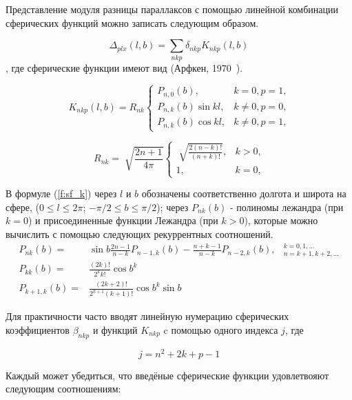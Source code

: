 \documentclass[14pt]{article} %
\begin{document}
Представление модуля разницы параллаксов с помощью линейной комбинации сферических функций можно записать следующим образом.


$$ \Delta_{plx} (l,b) = \sum_{nkp}\delta_{nkp}K_{nkp}(l,b) $$,
где сферические функции имеют вид (Арфкен, 1970~\cite{book:arfken}).

\begin{equation}\label{f:sf_k}
K_{nkp}(l,b) = R_{nk} \left\{ \begin{array}{ll}
P_{n,0}(b), & \textrm{$k=0, p=1$,}\\
P_{n,k}(b)\sin{kl}, & \textrm{$k\neq0, p=0$,}\\
P_{n,k}(b)\cos{kl}, & \textrm{$k\neq0, p=1$,}
\end{array} \right.
\end{equation}

\begin{equation}
R_{nk} = \sqrt[]{\frac{2n+1}{4\pi}} \left\{ \begin{array}{cc}
\sqrt[]{\frac{2(n-k)!}{(n+k)!}}, & \textrm{$k>0$,}\\
1, & \textrm{$k=0$,}
\end{array} \right.
\end{equation}

В формуле (\ref{f:sf_k}) через $l$ и $b$ обозначены соответственно долгота и широта на сфере, ($0 \leq l \leq 2\pi$; $-\pi/2\leq b \leq \pi/2$); через $P_{nk}(b)$ - полиномы лежандра (при $k = 0$) и присоединенные функции Лежандра (при $k > 0$), которые можно вычислить с помощью следующих рекуррентных соотношений. 
\begin{equation}
\begin{array}{rll}
P_{nk}(b)=&\sin{b\frac{2n-1}{n-k}}P_{n-1,k}(b)-\frac{n+k-1}{n-k}P_{n-2,k}(b), & {}^{k=0,1,...}_{n=k+1,k+2,...}\\
P_{kk}(b)=&\frac{(2k)!}{2^{k}k!}{\cos{b}}^{k}\\
P_{k+1,k}(b)=&\frac{(2k+2)!}{2^{k+1}(k+1)!}{\cos{b}}^{k}\sin{b}
\end{array}
\end{equation}

Для практичности часто вводят линейную нумерацию  сферических коэффициентов $\beta_{nkp}$ и функций $K_{nkp}$ c помощью одного индекса $j$, где

\begin{equation}\label{f:sf_j}
j = n^2 + 2k + p -1
\end{equation}

Каждый может убедиться, что введёные сферические функции удовлетвояют следующим соотношениям:
\end{document}
